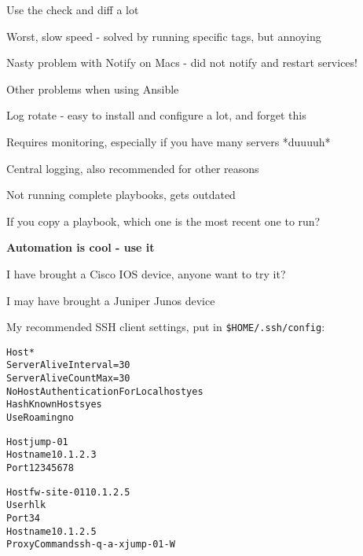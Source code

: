 \documentclass[18pt,landscape,a4paper,footrule]{foils}
\begin{document}
\centerline{Use the check and diff a lot \smiley}



\begin{list2}
\item Worst, slow speed - solved by running specific tags, but annoying
\item Nasty problem with Notify on Macs - did not notify and restart services!
\end{list2}


Other problems when using Ansible

\begin{list2}
\item Log rotate - easy to install and configure a lot, and forget this
\item Requires monitoring, especially if you have many servers *duuuuh*
\item Central logging, also recommended for other reasons
\item Not running complete playbooks, gets outdated
\item If you copy a playbook, which one is the most recent one to run?
\end{list2}



\begin{center}
\vskip 5mm
{\color{titlecolor}\LARGE \bf Automation is cool - use it}
\vskip 5mm

\end{center}



I have brought a Cisco IOS device, anyone want to try it?\\

I may have brought a Juniper Junos device\\


My recommended SSH client settings, put in \verb+$HOME/.ssh/config+:
\begin{alltt}\footnotesize
Host *
    ServerAliveInterval=30
    ServerAliveCountMax=30
    NoHostAuthenticationForLocalhost yes
    HashKnownHosts yes
    UseRoaming no

Host jump-01
  Hostname 10.1.2.3
  Port 12345678

Host fw-site-01 10.1.2.5
  User hlk
  Port 34
  Hostname 10.1.2.5
  ProxyCommand ssh -q -a -x jump-01 -W %h:%p
\end{alltt}
\end{document}
